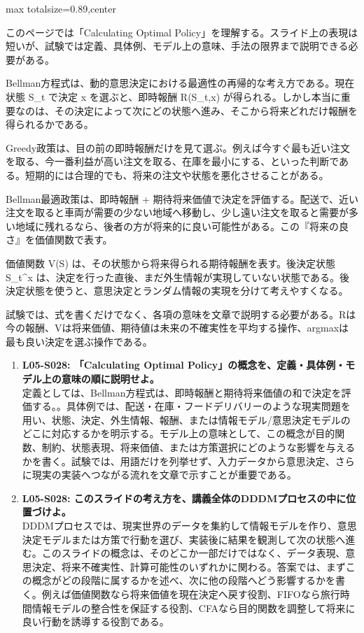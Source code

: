 \begin{minipage}[t]{0.58\textwidth}
\begin{adjustbox}{max totalsize={\textwidth}{0.89\textheight},center}
\begin{minipage}{\textwidth}\scriptsize
{}このページでは「Calculating Optimal Policy」を理解する。スライド上の表現は短いが、試験では定義、具体例、モデル上の意味、手法の限界まで説明できる必要がある。\par
Bellman方程式は、動的意思決定における最適性の再帰的な考え方である。現在状態 S\_t で決定 x を選ぶと、即時報酬 R(S\_t,x) が得られる。しかし本当に重要なのは、その決定によって次にどの状態へ進み、そこから将来どれだけ報酬を得られるかである。\par
Greedy政策は、目の前の即時報酬だけを見て選ぶ。例えば今すぐ最も近い注文を取る、今一番利益が高い注文を取る、在庫を最小にする、といった判断である。短期的には合理的でも、将来の注文や状態を悪化させることがある。\par
Bellman最適政策は、即時報酬 + 期待将来価値で決定を評価する。配送で、近い注文を取ると車両が需要の少ない地域へ移動し、少し遠い注文を取ると需要が多い地域に残れるなら、後者の方が将来的に良い可能性がある。この『将来の良さ』を価値関数で表す。\par
価値関数 V(S) は、その状態から将来得られる期待報酬を表す。後決定状態 S\_t\textasciicircum{}x は、決定を行った直後、まだ外生情報が実現していない状態である。後決定状態を使うと、意思決定とランダム情報の実現を分けて考えやすくなる。\par
試験では、式を書くだけでなく、各項の意味を文章で説明する必要がある。Rは今の報酬、Vは将来価値、期待値は未来の不確実性を平均する操作、argmaxは最も良い決定を選ぶ操作である。\par{}\begin{enumerate}\item \textbf{L05-S028: 「Calculating Optimal Policy」の概念を、定義・具体例・モデル上の意味の順に説明せよ。}\\定義としては、Bellman方程式は、即時報酬と期待将来価値の和で決定を評価する。。具体例では、配送・在庫・フードデリバリーのような現実問題を用い、状態、決定、外生情報、報酬、または情報モデル/意思決定モデルのどこに対応するかを明示する。モデル上の意味として、この概念が目的関数、制約、状態表現、将来価値、または方策選択にどのような影響を与えるかを書く。試験では、用語だけを列挙せず、入力データから意思決定、さらに現実の実装へつながる流れを文章で示すことが重要である。\item \textbf{L05-S028: このスライドの考え方を、講義全体のDDDMプロセスの中に位置づけよ。}\\DDDMプロセスでは、現実世界のデータを集約して情報モデルを作り、意思決定モデルまたは方策で行動を選び、実装後に結果を観測して次の状態へ進む。このスライドの概念は、そのどこか一部だけではなく、データ表現、意思決定、将来不確実性、計算可能性のいずれかに関わる。答案では、まずこの概念がどの段階に属するかを述べ、次に他の段階へどう影響するかを書く。例えば価値関数なら将来価値を現在決定へ戻す役割、FIFOなら旅行時間情報モデルの整合性を保証する役割、CFAなら目的関数を調整して将来に良い行動を誘導する役割である。\end{enumerate}

\end{minipage}
\end{adjustbox}
\end{minipage}
